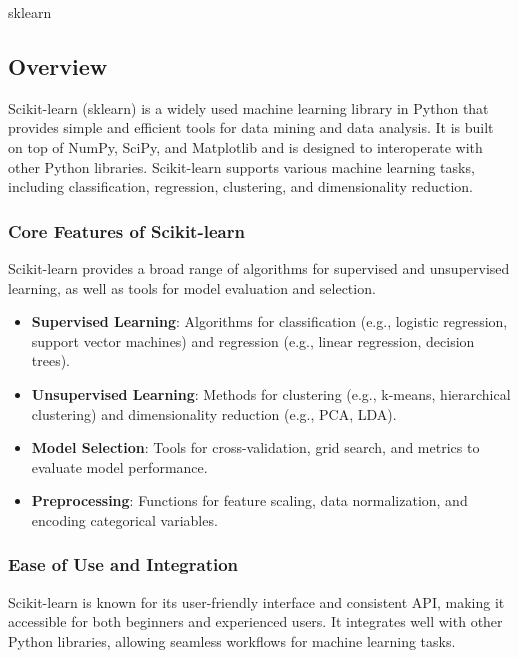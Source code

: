 \begin{notes}{sklearn}
    \subsection*{Overview}

    Scikit-learn (sklearn) is a widely used machine learning library in Python that provides simple and efficient tools for data mining and data analysis. It is built on top of NumPy, SciPy, and 
    Matplotlib and is designed to interoperate with other Python libraries. Scikit-learn supports various machine learning tasks, including classification, regression, clustering, and dimensionality reduction.
    
    \subsubsection*{Core Features of Scikit-learn}
    
    Scikit-learn provides a broad range of algorithms for supervised and unsupervised learning, as well as tools for model evaluation and selection.
    
    \begin{highlight}
        \begin{itemize}
            \item \textbf{Supervised Learning}: Algorithms for classification (e.g., logistic regression, support vector machines) and regression (e.g., linear regression, decision trees).
            \item \textbf{Unsupervised Learning}: Methods for clustering (e.g., k-means, hierarchical clustering) and dimensionality reduction (e.g., PCA, LDA).
            \item \textbf{Model Selection}: Tools for cross-validation, grid search, and metrics to evaluate model performance.
            \item \textbf{Preprocessing}: Functions for feature scaling, data normalization, and encoding categorical variables.
        \end{itemize}
    \end{highlight}
    
    \subsubsection*{Ease of Use and Integration}
    
    Scikit-learn is known for its user-friendly interface and consistent API, making it accessible for both beginners and experienced users. It integrates well with other Python libraries, allowing 
    seamless workflows for machine learning tasks.
    

\end{notes}

